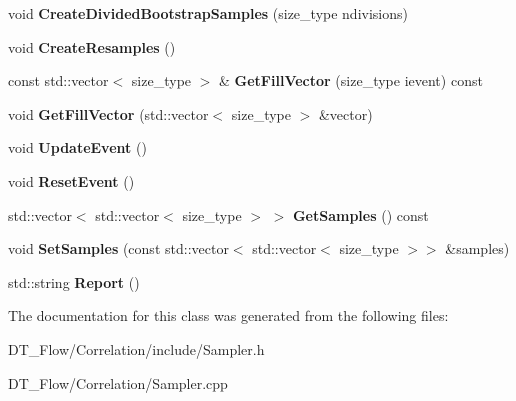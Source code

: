\begin{DoxyCompactItemize}
void {\bfseries Create\+Divided\+Bootstrap\+Samples} (size\+\_\+type ndivisions)
\item 
\mbox{\label{classQn_1_1Sampler_a6f7b6ae009eae228bb9738e0bdb7cd71}} 
void {\bfseries Create\+Resamples} ()
\item 
\mbox{\label{classQn_1_1Sampler_a206327cba9e1bc5e879a4814cad6b70d}} 
const std\+::vector$<$ size\+\_\+type $>$ \& {\bfseries Get\+Fill\+Vector} (size\+\_\+type ievent) const
\item 
\mbox{\label{classQn_1_1Sampler_a3ae9867cb08031cc13db517368934609}} 
void {\bfseries Get\+Fill\+Vector} (std\+::vector$<$ size\+\_\+type $>$ \&vector)
\item 
\mbox{\label{classQn_1_1Sampler_a3ccd05e48187ac40040700f2585c39de}} 
void {\bfseries Update\+Event} ()
\item 
\mbox{\label{classQn_1_1Sampler_a07c562d61b9c41364dfbb0d0dad2cc40}} 
void {\bfseries Reset\+Event} ()
\item 
\mbox{\label{classQn_1_1Sampler_a5407b83a6a302a03b8e8fcb119792c28}} 
std\+::vector$<$ std\+::vector$<$ size\+\_\+type $>$ $>$ {\bfseries Get\+Samples} () const
\item 
\mbox{\label{classQn_1_1Sampler_aec220862f1fbf315f6131c07e2fe6bf9}} 
void {\bfseries Set\+Samples} (const std\+::vector$<$ std\+::vector$<$ size\+\_\+type $>$$>$ \&samples)
\item 
\mbox{\label{classQn_1_1Sampler_a57cd57478f5495eca5cc71ac9796ca27}} 
std\+::string {\bfseries Report} ()
\end{DoxyCompactItemize}


The documentation for this class was generated from the following files\+:\begin{DoxyCompactItemize}
\item 
D\+T\+\_\+\+Flow/\+Correlation/include/Sampler.\+h\item 
D\+T\+\_\+\+Flow/\+Correlation/Sampler.\+cpp\end{DoxyCompactItemize}
